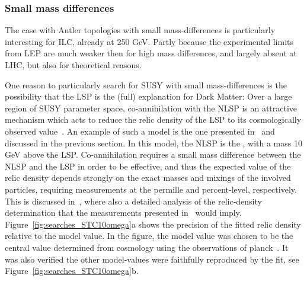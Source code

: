 \subsubsection{Small mass differences}
\label{subsec:searches_lowdm}
The case with Antler topologies with small mass-differences
is particularly interesting for ILC, already at 250 GeV.
Partly because the experimental limits from LEP are much weaker then
for high mass differences,
and largely absent at LHC,
but also for theoretical reasons.

One reason to particularly search for SUSY with small
mass-differences is the possibility that the LSP is the (full) explanation
for Dark Matter:
Over a large region of SUSY parameter space, co-annihilation with the NLSP
is an attractive mechanism which acts to reduce the relic density of the LSP to its
cosmologically observed value~\cite{deVries:2015hva}. 
An example of such a model is the one presented in~\cite{Berggren:2015qua} and
discussed in the previous section.
In this model,
the NLSP is the \stone,
with a mass 10 GeV above the LSP.
Co-annihilation requires
a small mass difference between the NLSP and the LSP in order to be effective,
and thus the expected value of the relic density depends strongly on the exact
masses and mixings of the involved particles, requiring measurements at the permille and
percent-level, respectively.
This is discussed in~\cite{Lehtinen:415433}, 
where also a detailed analysis of the relic-density determination that
the measurements presented in~\cite{Berggren:2015qua} would imply.
Figure~\ref{fig:searches_STC10omega}a shows the precision
of the fitted relic density relative to the model value.
In the figure, 
the model value was chosen to be
the central value determined from cosmology using the observations 
of {\sc planck}~\cite{Ade:2015xua}.
It was also verified the other model-values were faithfully reproduced
by the fit, see Figure~\ref{fig:searches_STC10omega}b.
